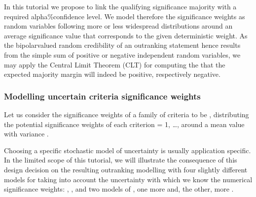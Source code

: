 \documentclass[a4paper,12pt,english]{sphinxhowto}
\begin{document}
\sphinxAtStartPar
In this tutorial we propose to link the qualifying significance majority with a required alpha\%\sphinxhyphen{}confidence level. We model therefore the significance weights as random variables following more or less widespread distributions around an average significance value that corresponds to the given deterministic weight. As the bipolar\sphinxhyphen{}valued random credibility of an outranking statement hence results from the simple sum of positive or negative independent random variables, we may apply the Central Limit Theorem (CLT) for computing the  that the expected majority margin will indeed be positive, respectively negative.


\subsubsection{Modelling uncertain criteria significance weights}
\label{\detokenize{pearls:modelling-uncertain-criteria-significance-weights}}
\sphinxAtStartPar
Let us consider the significance weights of a family  of  criteria to be  , distributing the potential significance weights of each criterion  = 1, …,  around a mean value  with variance .

\sphinxAtStartPar
Choosing a specific stochastic model of uncertainty is usually application specific. In the limited scope of this tutorial, we will illustrate the consequence of this design decision on the resulting outranking modelling with four slightly different models for taking into account the uncertainty with which we know the numerical significance weights: , , and two models of , one more  and, the other, more .
\end{document}
